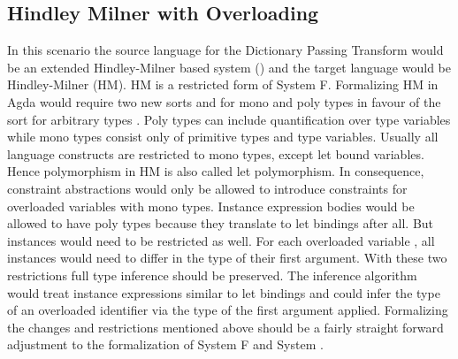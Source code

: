 \subsection{Hindley Milner with Overloading}
In this scenario the source language for the Dictionary Passing Transform would be an extended Hindley-Milner based system (\HMo) and the target language would be Hindley-Milner (HM). 
HM is a restricted form of System F. Formalizing HM in Agda would require two new sorts  and  for mono and poly types in favour of the sort for arbitrary types . Poly types can include quantification over type variables while mono types consist only of primitive types and type variables. 
Usually all language constructs are restricted to mono types, except let bound variables. 
Hence polymorphism in HM is also called let polymorphism.  
In consequence, constraint abstractions would only be allowed to introduce constraints for overloaded variables with mono types. 
Instance expression bodies would be allowed to have poly types because they translate to let bindings after all.
But instances would need to be restricted as well. For each overloaded variable , all instances would need to differ in the type of their first argument.
With these two restrictions full type inference should be preserved. The inference algorithm would treat instance expressions similar to let bindings and could infer the type of an overloaded identifier via the type of the first argument applied.
Formalizing the changes and restrictions mentioned above should be a fairly straight forward adjustment to the formalization of System F and System \Fo.

